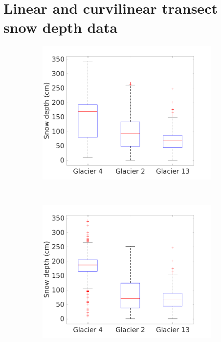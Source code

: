 \documentclass{sfuthesis}
\begin{document}
\section{Linear and curvilinear transect snow depth data}

\begin{figure}[H]
    \centering
    \begin{subfigure}[b]{0.48\textwidth}
        \includegraphics[width=\textwidth]{box_depth_wZZ.png}
        \caption{ }
        \label{fig:box_depth_wZZ}
    \end{subfigure}
    ~
    \begin{subfigure}[b]{0.48\textwidth}
        \includegraphics[width=\textwidth]{box_depth_noZZ.png}
        \caption{}
        \label{fig:box_depth_noZZ}
    \end{subfigure}


\end{figure}
\end{document}
